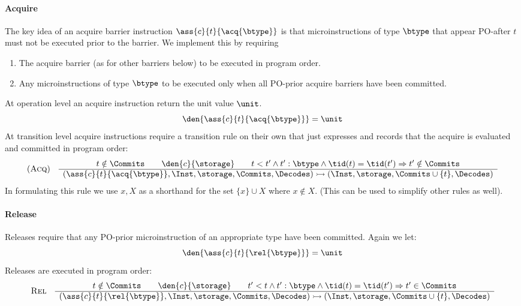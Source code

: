 \paragraph{Acquire}
%
The key idea of an acquire barrier instruction $\ass{c}{t}{\acq{\btype}}$ is that microinstructions of type $\btype$ that appear PO-after $t$ must not be executed prior to the barrier. We implement this by requiring
\begin{enumerate}
\item The acquire barrier (as for other barriers below) to be executed in program order.
\item Any microinstructions of type $\btype$ to be executed only when all PO-prior acquire barriers have been committed.
\end{enumerate}
%
At operation level an acquire instruction return the unit value $\unit$.
\[
\den{\ass{c}{t}{\acq{\btype}}} = \unit
\]
At transition level acquire instructions require a transition rule on their own that just expresses and records that the acquire is evaluated and committed in program order:
%
\[
\begin{array}{cc}
(\mbox{\sc{Acq}})
&
\begin{array}{c}
  t\notin\Commits \qquad
  \den{c}{\storage} \qquad
  t<t' \wedge t':\btype\wedge\tid(t) = \tid(t')\Rightarrow t'\notin\Commits \\ \hline
(\ass{c}{t}{\acq{\btype}},\Inst, \storage, \Commits, \Decodes) \rightarrowtail (\Inst,\storage, \Commits\cup\{t\}, \Decodes)
\end{array}
\end{array}
\]
%
In formulating this rule we use $x,X$ as a shorthand for the set $\{x\}\cup X$ where $x\notin X$. (This can be used to simplify other rules as well).

\paragraph{Release}
Releases require that any PO-prior microinstruction of an appropriate type have been committed. 
%
Again we let:
%
\[
\den{\ass{c}{t}{\rel{\btype}}}=\unit
\]
Releases are executed in program order:
%
\[
\begin{array}{cc}
\mbox{\sc{Rel}} &
\begin{array}{c}
t\notin\Commits \qquad
\den{c}{\storage} \qquad
t'<t \wedge t':\btype \wedge\tid(t) = \tid(t') \Rightarrow t'\in\Commits \\ \hline
(\ass{c}{t}{\rel{\btype}},\Inst, \storage, \Commits, \Decodes)\rightarrowtail
(\Inst,\storage,\Commits\cup\{t\},\Decodes)
\end{array}
\end{array}
\]
%
